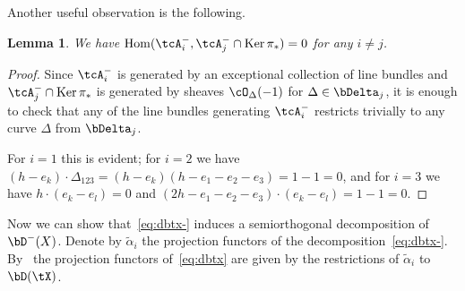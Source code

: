 \documentclass[11pt]{amsart}
\DeclareMathOperator{\Hom}{\mathrm{Hom}}
\DeclareMathOperator{\Ker}{\mathrm{Ker}}
\theoremstyle{plain}
\newtheorem{lemma}[theorem]{Lemma}
\theoremstyle{definition}
\theoremstyle{remark}
\begin{document}
Another useful observation is the following.

\begin{lemma}\label{lemma:ker-pis-orthogonality}
We have $\Hom(\tcA_i^-,\tcA_j^- \cap \Ker \pi_*) = 0$ for any $i \ne j$.
\end{lemma}
\begin{proof}
Since $\tcA_i^-$ is generated by an exceptional collection of line bundles and $\tcA_j^- \cap \Ker \pi_*$ is generated by sheaves $\cO_\Delta(-1)$ for $\Delta \in \bDelta_j$,
it is enough to check that any of the line bundles generating $\tcA_i^-$ restricts trivially to any curve $\Delta$ from $\bDelta_j$.

For $i = 1$ this is evident; for $i = 2$ we have
$(h-e_k)\cdot \Delta_{123} = (h - e_k)(h - e_1 - e_2 - e_3) = 1 - 1 = 0$,
and for $i = 3$ we have 
$h\cdot (e_k - e_l) = 0$
and
$(2h - e_1 - e_2 - e_3) \cdot (e_k - e_l) = 1 - 1 = 0$.
\end{proof}



Now we can show that~\eqref{eq:dbtx-} induces a semiorthogonal decomposition of~$\bD^-(X)$.
Denote by $\tilde\alpha_i$ the projection functors of the decomposition~\eqref{eq:dbtx-}.
By~\cite[Proposition~4.2]{kuznetsov2011base} the projection functors of~\eqref{eq:dbtx} are given 
by the restrictions of $\tilde\alpha_i$ to $\bD(\tX)$.
\end{document}
